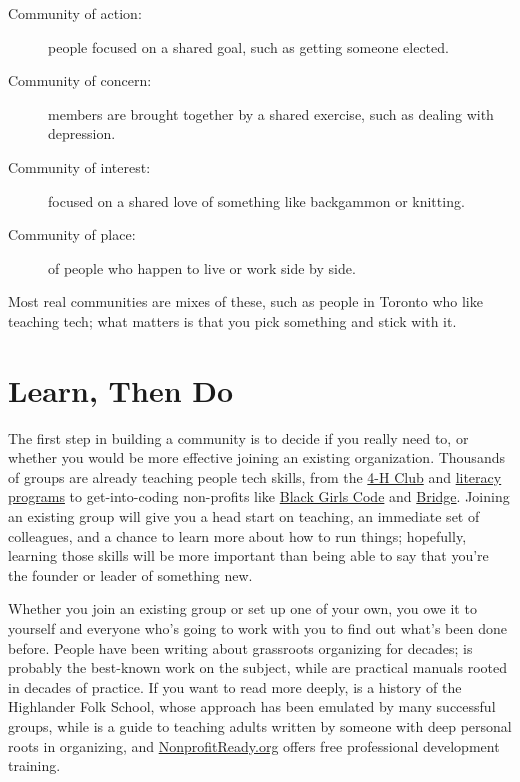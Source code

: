 \begin{description}

\item[Community of action:] people focused on a shared goal, such as
  getting someone elected.

\item[Community of concern:] members are brought together by a shared
  exercise, such as dealing with depression.

\item[Community of interest:] focused on a shared love of something
  like backgammon or knitting.

\item[Community of place:] of people who happen to live or work side
  by side.

\end{description}

Most real communities are mixes of these, such as people in Toronto
who like teaching tech; what matters is that you pick something and
stick with it.

\section{Learn, Then Do}\label{s:community-learn-then-do}

The first step in building a community is to decide if you really need
to, or whether you would be more effective joining an existing
organization. Thousands of groups are already teaching people tech
skills, from the \href{http://www.4-h-canada.ca/}{4-H Club} and
\href{https://www.frontiercollege.ca/}{literacy programs} to
get-into-coding non-profits like
\href{http://www.blackgirlscode.com/}{Black Girls Code} and
\href{http://bridgeschool.io/}{Bridge}. Joining an existing group will
give you a head start on teaching, an immediate set of colleagues, and
a chance to learn more about how to run things; hopefully, learning
those skills will be more important than being able to say that you're
the founder or leader of something new.

Whether you join an existing group or set up one of your own, you owe
it to yourself and everyone who's going to work with you to find out
what's been done before. People have been writing about grassroots
organizing for decades; \cite{Alin1989} is probably the best-known
work on the subject, while \cite{Brow2007,Midw2010} are practical
manuals rooted in decades of practice. If you want to read more
deeply, \cite{Adam1975} is a history of the Highlander Folk School,
whose approach has been emulated by many successful groups, while
\cite{Spal2014} is a guide to teaching adults written by someone with
deep personal roots in organizing, and
\href{https://www.nonprofitready.org/}{NonprofitReady.org} offers free
professional development training.

